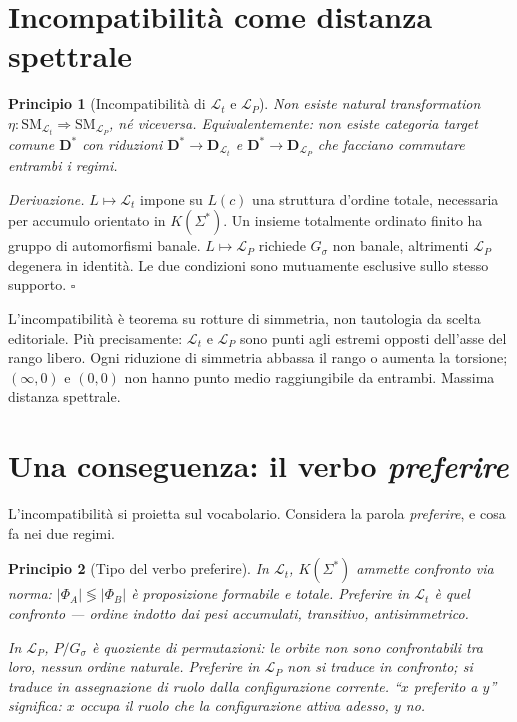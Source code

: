 \documentclass[
    oneside,                 %
    openany,                 %
    titlepage,
    11pt,
    a4paper,
    italian,
    DIV=14,                  %
    headinclude,
    footinclude=true,
    cleardoublepage=empty
]{scrbook}
\theoremstyle{ctplain}
\newtheorem{principio}{Principio}[chapter]
\theoremstyle{ctdef}
\theoremstyle{ctrem}
\newcommand{\Lt}{\mathcal{L}_t}
\newcommand{\LP}{\mathcal{L}_P}
\newcommand{\Phii}{\Phi}
\newcommand{\Gs}{G_{\sigma}}
\newcommand{\KSigma}{K(\Sigma^{*})}
\begin{document}
\section*{Incompatibilità come distanza spettrale}

\begin{principio}[Incompatibilità di $\Lt$ e $\LP$]
Non esiste natural transformation $\eta : \mathrm{SM}_{\Lt} \Rightarrow \mathrm{SM}_{\LP}$, né viceversa. Equivalentemente: non esiste categoria target comune $\mathbf{D}^{*}$ con riduzioni $\mathbf{D}^{*} \to \mathbf{D}_{\Lt}$ e $\mathbf{D}^{*} \to \mathbf{D}_{\LP}$ che facciano commutare entrambi i regimi.
\end{principio}

\emph{Derivazione.} $L \mapsto \Lt$ impone su $L(c)$ una struttura d'ordine totale, necessaria per accumulo orientato in $\KSigma$. Un insieme totalmente ordinato finito ha gruppo di automorfismi banale. $L \mapsto \LP$ richiede $\Gs$ non banale, altrimenti $\LP$ degenera in identità. Le due condizioni sono mutuamente esclusive sullo stesso supporto. $\square$

L'incompatibilità è teorema su rotture di simmetria, non tautologia da scelta editoriale. Più precisamente: $\Lt$ e $\LP$ sono punti agli estremi opposti dell'asse del rango libero. Ogni riduzione di simmetria abbassa il rango o aumenta la torsione; $(\infty, 0)$ e $(0, 0)$ non hanno punto medio raggiungibile da entrambi. Massima distanza spettrale.

\section*{Una conseguenza: il verbo \emph{preferire}}

L'incompatibilità si proietta sul vocabolario. Considera la parola \emph{preferire}, e cosa fa nei due regimi.

\begin{principio}[Tipo del verbo preferire]
In $\Lt$, $\KSigma$ ammette confronto via norma: $|\Phii_A| \lessgtr |\Phii_B|$ è proposizione formabile e totale. \emph{Preferire} in $\Lt$ è quel confronto --- ordine indotto dai pesi accumulati, transitivo, antisimmetrico.

In $\LP$, $P/\Gs$ è quoziente di permutazioni: le orbite non sono confrontabili tra loro, nessun ordine naturale. \emph{Preferire} in $\LP$ non si traduce in confronto; si traduce in assegnazione di ruolo dalla configurazione corrente. ``$x$ preferito a $y$'' significa: $x$ occupa il ruolo che la configurazione attiva adesso, $y$ no.
\end{principio}
\end{document}
